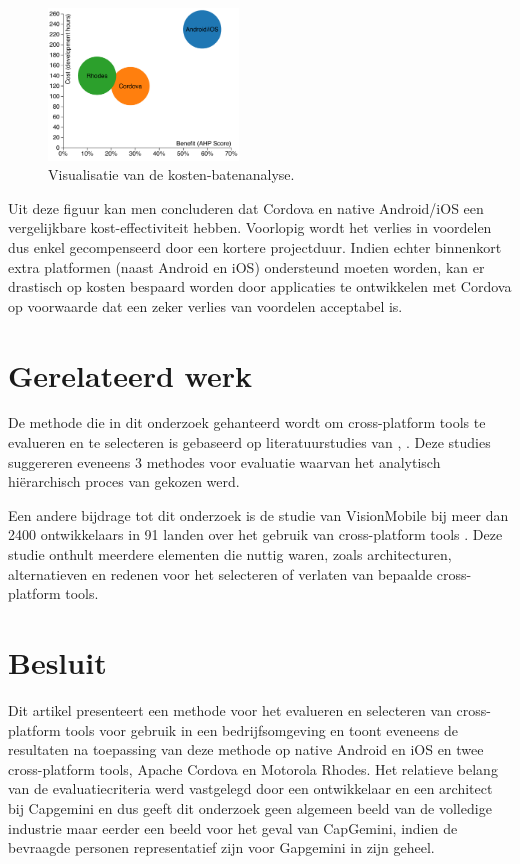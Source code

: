 \documentclass[a4paper]{IEEEconf}
\begin{document}
\begin{figure}[h!]
    \centering
    \includegraphics[width=0.45\textwidth]{../resources/figs/benefit-cost.pdf}
    \caption{Visualisatie van de kosten-batenanalyse.}
    \label{fig:cost-benefit}
\end{figure}

Uit deze figuur kan men concluderen dat Cordova en native Android/iOS een vergelijkbare kost-effectiviteit hebben. Voorlopig wordt het verlies in voordelen dus enkel gecompenseerd door een kortere projectduur. Indien echter binnenkort extra platformen (naast Android en iOS) ondersteund moeten worden, kan er drastisch op kosten bespaard worden door applicaties te ontwikkelen met Cordova op voorwaarde dat een zeker verlies van voordelen acceptabel is. 

\section{Gerelateerd werk}

De methode die in dit onderzoek gehanteerd wordt om cross-platform tools te evalueren en te selecteren is gebaseerd op literatuurstudies van \citet{Jadhav:2009}, \cite{Jadhav:2011}. Deze studies suggereren eveneens 3 methodes voor evaluatie waarvan het analytisch hi\"erarchisch proces van  \citet{Saaty:1980} gekozen werd.

Een andere bijdrage tot dit onderzoek is de studie van VisionMobile bij meer dan 2400 ontwikkelaars in 91 landen over het gebruik van cross-platform tools \cite{VMCPT:2012}. Deze studie onthult meerdere elementen die nuttig waren, zoals architecturen, alternatieven en redenen voor het selecteren of verlaten van bepaalde cross-platform tools.

\section{Besluit}

Dit artikel presenteert een methode voor het evalueren en selecteren van cross-platform tools voor gebruik in een bedrijfsomgeving en toont eveneens de resultaten na toepassing van deze methode op native Android en iOS en twee cross-platform tools, Apache Cordova en Motorola Rhodes. Het relatieve belang van de evaluatiecriteria werd vastgelegd door een ontwikkelaar en een architect bij Capgemini en dus geeft dit onderzoek geen algemeen beeld van de volledige industrie maar eerder een beeld voor het geval van CapGemini, indien de bevraagde personen representatief zijn voor Gapgemini in zijn geheel.
\end{document}
